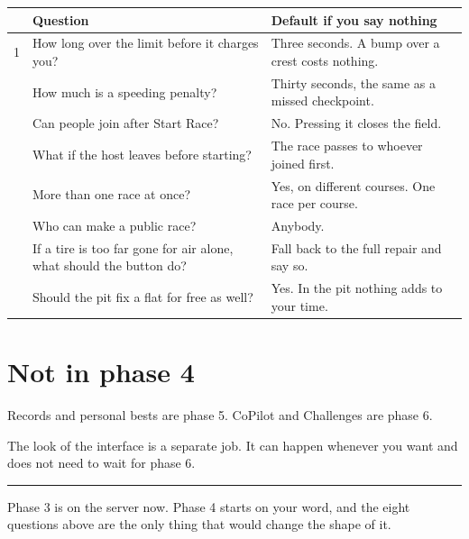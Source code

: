 \documentclass[11pt,a4paper]{article}
\begin{document}
\begin{longtable}{@{}p{6mm}>{\raggedright\arraybackslash}p{70mm}>{\raggedright\arraybackslash}p{72mm}@{}}
\toprule
& \textbf{Question} & \textbf{Default if you say nothing} \\
\midrule
\endhead
1 & How long over the limit before it charges you?
  & Three seconds. A bump over a crest costs nothing. \\
\addlinespace
2 & How much is a speeding penalty?
  & Thirty seconds, the same as a missed checkpoint. \\
\addlinespace
3 & Can people join after Start Race?
  & No. Pressing it closes the field. \\
\addlinespace
4 & What if the host leaves before starting?
  & The race passes to whoever joined first. \\
\addlinespace
5 & More than one race at once?
  & Yes, on different courses. One race per course. \\
\addlinespace
6 & Who can make a public race?
  & Anybody. \\
\addlinespace
7 & If a tire is too far gone for air alone, what should the button do?
  & Fall back to the full repair and say so. \\
\addlinespace
8 & Should the pit fix a flat for free as well?
  & Yes. In the pit nothing adds to your time. \\
\bottomrule
\end{longtable}

\section{Not in phase 4}

Records and personal bests are phase 5. CoPilot and Challenges are phase 6.

The look of the interface is a separate job. It can happen whenever you want
and does not need to wait for phase 6.

\vspace{10pt}
\hrule
\vspace{6pt}

{\small Phase 3 is on the server now. Phase 4 starts on your word, and the eight
questions above are the only thing that would change the shape of it.}
\end{document}
